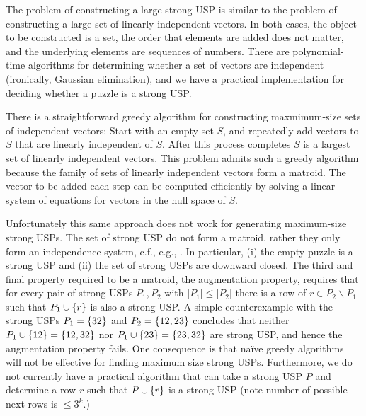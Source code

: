 \documentclass[11pt]{article}
\begin{document}
The problem of constructing a large strong USP is similar to the
problem of constructing a large set of linearly independent vectors.
In both cases, the object to be constructed is a set, the order that elements
are added does not matter, and the underlying elements are sequences
of numbers.  There are polynomial-time algorithms for determining
whether a set of vectors are independent (ironically, Gaussian
elimination), and we have a practical implementation for deciding whether a
puzzle is a strong USP.

There is a straightforward greedy algorithm for constructing
maxmimum-size sets of independent vectors: Start with an empty set
$S$, and repeatedly add vectors to $S$ that are linearly independent
of $S$.  After this process completes $S$ is a largest set of linearly
independent vectors.  This problem admits such a greedy algorithm
because the family of sets of linearly independent vectors form a
matroid.  The vector to be added each step can be computed efficiently
by solving a linear system of equations for vectors in the null space
of $S$.


Unfortunately this same approach does not work for generating
maximum-size strong USPs.  The set of strong USP do not form a
matroid, rather they only form an independence system, c.f., e.g.,
\cite{oxl06}.  In particular, (i) the empty puzzle is a strong USP and (ii) the
set of strong USPs are downward closed.
The third
and final property required to be a matroid, the augmentation
property, requires that for every pair of strong USPs $P_1, P_2$ with
$|P_1| \le |P_2|$ there is a row of $r \in P_2 \backslash P_1$ such
that $P_1 \cup \left\{ r \right\}$ is also a strong USP.  A simple counterexample
with the strong USPs $P_1 = \left\{ 32 \right\}$ and $P_2 = \left\{ 12, 23 \right\}$
concludes that neither $P_1 \cup \left\{ 12 \right\} = \left\{ 12, 32 \right\}$ nor $P_1
\cup \left\{ 23 \right\} = \left\{ 23, 32 \right\}$ are strong USP, and hence the
augmentation property fails.
One consequence is that na\"{i}ve greedy algorithms will not be
effective for finding maximum size strong USPs.  Furthermore, we do
not currently have a practical algorithm that can take a strong USP
$P$ and determine a row $r$ such that $P \cup \left\{ r \right\}$ is a strong
USP (note number of possible next rows is $\le 3^k$.)
\end{document}
